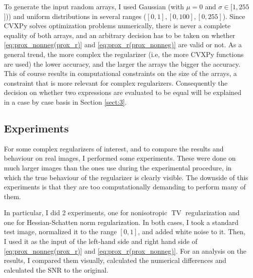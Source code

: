 To generate the input random arrays, I used Gaussian (with $\mu = 0$ and $\sigma \in [1, 255$])) and uniform distributions in several ranges ($[0,1], [0,100], [0,255]$). Since CVXPy solves optimization problems numerically, there is never a complete equality of both arrays, and an arbitrary decision has to be taken on whether \eqref{eq:prox_nonneg(prox_r)} and \eqref{eq:prox_r(prox_nonneg)} are valid or not. As a general trend, the more complex the regularizer (i.e, the more CVXPy functions are used) the lower accuracy, and the larger the arrays the bigger the accuracy. This of course results in computational constraints on the size of the arrays, a constraint that is more relevant for complex regularizers. Consequently the decision on whether two expressions are evaluated to be equal will be explained in a case by case basis in Section \ref{sect:3}.

\subsection{Experiments}

For some complex regularizers of interest, and to compare the results and behaviour on real images, I performed some experiments. These were done on much larger images than the ones use during the experimental procedure, in which the true behaviour of the regularizer is clearly visible. The downside of this experiments is that they are too computationally demanding to perform many of them. 

In particular, I did 2 experiments, one for nonisotropic $\operatorname{TV}$ regularization and one for Hessian-Schatten norm regularization. In both cases, I took a standard test image, normalized it to the range $[0, 1]$, and added white noise to it. Then, I used it as the input of the left-hand side and right hand side of \eqref{eq:prox_nonneg(prox_r)} and \eqref{eq:prox_r(prox_nonneg)}. For an analysis on the results, I compared them visually, calculated the numerical differences and calculated the $\mathrm{SNR}$ to the original.






